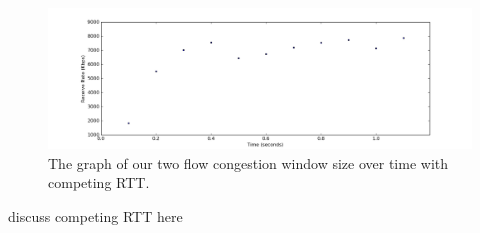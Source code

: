 \documentclass[11pt]{article}
\begin{document}
\begin{enumerate}
\begin{figure}[H]
\caption{The graph of our two flow congestion window size over time with competing RTT.}
  \label{figure17}
    \centering
    \includegraphics[width=\linewidth]{1f_rate.png}
\end{figure}

discuss competing RTT here

\end{enumerate}
\end{document}
